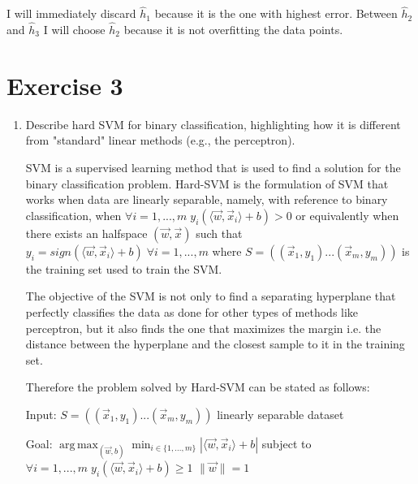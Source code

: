 \documentclass[a4paper,11pt,oneside]{book}
\DeclareMathOperator*{\argmax}{arg\,max}
\begin{document}
\begin{enumerate}
    \begin{solution}
        I will immediately discard $\hat{h}_1$ because it is the one with highest error. Between $\hat{h}_2$ and $\hat{h}_3$ I will choose $\hat{h}_2$ because it is not overfitting the data points.
    \end{solution}
\end{enumerate}
    
\section{Exercise 3}
\begin{enumerate}
\item Describe hard SVM for binary classification, highlighting how it is different from "standard" linear methods (e.g., the perceptron).
    \begin{solution}
        SVM is a supervised learning method that is used to find a solution for the binary classification problem. Hard-SVM is the formulation of SVM that works when data are linearly separable, namely, with reference to binary classification, when $\forall i = 1,...,m \; y_i(\langle \vec{w},\vec{x}_i \rangle +b) > 0$ or equivalently when there exists an halfspace $(\vec{w},\vec{x})$ such that $y_i = sign(\langle \vec{w},\vec{x}_i \rangle +b) \; \forall i = 1,...,m$ where $S = ((\vec{x}_1,y_1)...(\vec{x}_m,y_m))$ is the training set used to train the SVM.
        
        The objective of the SVM is not only to find a separating hyperplane that perfectly classifies the data as done for other types of methods like perceptron, but it also finds the one that maximizes the margin i.e. the distance between the hyperplane and the closest sample to it in the training set.
        
        Therefore the problem solved by Hard-SVM can be stated as follows:
        
        Input: $S = ((\vec{x}_1,y_1)...(\vec{x}_m,y_m))$ linearly separable dataset
        
        Goal: $\argmax_{(\vec{w},b)} \min_{i\in\{1,...,m\}}|\langle \vec{w},\vec{x}_i \rangle +b|$ subject to $\forall i = 1,...,m \; y_i(\langle \vec{w},\vec{x}_i \rangle +b) \geq 1$
        $\|\vec{w}\|=1$
        

\end{solution}
\end{enumerate}
\end{document}
